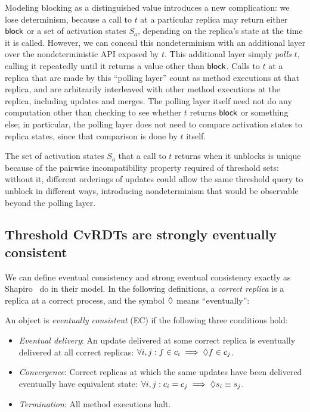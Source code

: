 Modeling blocking as a distinguished value introduces a new
complication: we lose determinism, because a call to $t$ at a
particular replica may return either $\textsf{block}$ or a set of activation
states $S_a$, depending on the replica's state at the time it is
called.  However, we can conceal this nondeterminism with an
additional layer over the nondeterministic API exposed by $t$.  This
additional layer simply \emph{polls} $t$, calling it repeatedly until
it returns a value other than $\textsf{block}$.  Calls to $t$ at a replica
that are made by this ``polling layer'' count as method executions at
that replica, and are arbitrarily interleaved with other method
executions at the replica, including updates and merges.  The polling
layer itself need not do any computation other than checking to see
whether $t$ returns $\textsf{block}$ or something else; in particular, the
polling layer does not need to compare activation states to replica
states, since that comparison is done by $t$ itself.

The set of activation states $S_a$ that a call to $t$ returns when it
unblocks is unique because of the pairwise incompatibility property
required of threshold sets: without it, different orderings of updates
could allow the same threshold query to unblock in different ways,
introducing nondeterminism that would be observable beyond the polling
layer.

\subsection{Threshold CvRDTs are strongly eventually consistent}

We can define eventual consistency and strong eventual consistency
exactly as Shapiro \etal~do in their model.  In the following
definitions, a \emph{correct replica} is a replica at a correct
process, and the  symbol $\lozenge$ means ``eventually'':

\begin{definition}
  \label{def:eventual-consistency}
  An object is \emph{eventually consistent} (EC) if the following three
  conditions hold:
  \begin{itemize}
    \item \emph{Eventual delivery}: An update delivered at some
      correct replica is eventually delivered at all correct replicas:
      $\forall i, j : f \in c_i \implies \lozenge f \in c_j$.
    \item \emph{Convergence}: Correct replicas at which the same
      updates have been delivered eventually have equivalent state:
      $\forall i, j : c_i = c_j \implies \lozenge s_i \equiv s_j$.
    \item \emph{Termination}: All method executions halt.
  \end{itemize}
\end{definition}


